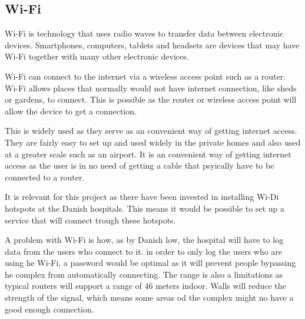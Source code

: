 \subsection{Wi-Fi} \label{wifitech}
Wi-Fi is  technology that uses radio waves to transfer data between electronic devices. Smartphones, computers, tablets and headsets are devices that may have Wi-Fi together with many other electronic devices\cite{wifi_devices}.

Wi-Fi can connect to the internet via a wireless access point such as a router. Wi-Fi allows places that normally would not have internet connection, like sheds or gardens, to connect. This is possible as the router or wireless access point will allow the device to get a connection.

This is widely used as they serve as an convenient way of getting internet access. They are fairly easy to set up and used widely in the private homes and also used at a greater scale such as an airport\cite{wifi_works}. It is an convenient way of getting internet access as the user is in no need of getting a cable that psyically have to be connected to a router.

It is relevant for this project as there have been invested in installing Wi-Di hotspots at the Danish hospitals\cite{wifi_hospi}. This means it would be possible to set up a service that will connect trough these hotspots.

A problem with Wi-Fi is how, as by Danish low, the hospital will have to log data from the users who connect to it\cite{wifi_log}. in order to only log the users who are using he Wi-Fi, a password would be optimal as it will prevent people bypassing he complex from automatically connecting. The range is also a limitations as typical routers will support a range of 46 meters indoor\cite{wifi_range}. Walls will reduce the strength of the signal, which means some areas od the complex might no have a good enough connection\cite{wifi_wall}.